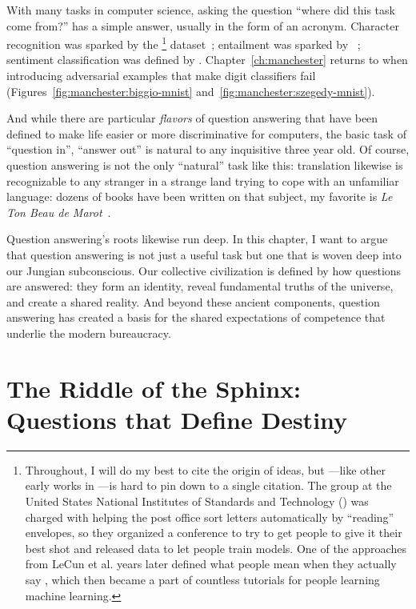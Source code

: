 

With many tasks in computer science, asking the question ``where did this task come from?'' has a simple answer, usually in the form of an acronym.
%
Character recognition was sparked by the \footnote{Throughout, I will do my best to cite the origin of ideas, but ---like other early works in ---is hard to pin down to a single citation.  The  group at the United States National Institutes of Standards and Technology () was charged with helping the post office sort letters automatically by ``reading'' envelopes, so they organized a conference to try to get people to give it their best shot and released data to let people train models.  One of the approaches from LeCun et al. years later defined what people mean when they actually say , which then became a part of countless tutorials for people learning machine learning.} dataset~\citep{wilkinson-92,lecun-98}; entailment was sparked by ~\citep{maccartney-08,bowman-etal-2015-large}; sentiment classification was defined by \citet{pang-08}.  Chapter~\ref{ch:manchester} returns to  when introducing adversarial examples that make digit classifiers fail (Figures~\ref{fig:manchester:biggio-mnist} and~\ref{fig:manchester:szegedy-mnist}).

And while there are particular \emph{flavors} of question answering that have been defined to make life easier or more discriminative for computers, the basic task of ``question in'', ``answer out'' is natural to any inquisitive three year old.
%
Of course, question answering is not the only ``natural'' task like this: translation likewise is recognizable to any stranger in a strange land trying to cope with an unfamiliar language: dozens of books have been written on that subject, my favorite is \textit{Le Ton Beau de Marot}~\citep{hofstadter-97}.


Question answering's roots likewise run deep.  In this chapter, I want to argue that question answering is not just a useful task but one that is woven deep into our Jungian subconscious.
%
Our collective civilization is defined by how questions are answered: they form an identity, reveal fundamental truths of the universe, and create a shared reality.
%
And beyond these ancient components, question answering has created a basis for the shared expectations of competence that underlie the modern bureaucracy.

\section{The Riddle of the Sphinx: Questions that Define Destiny}
\label{sec:civilization:sphinx}

